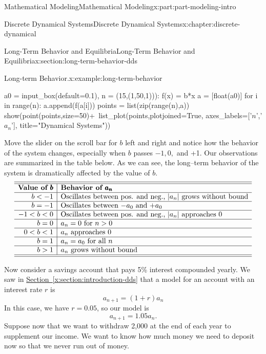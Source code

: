 \documentclass[oneside,10pt,]{book}
\newcommand{\xreffont}{\relax}
\numberwithin{equation}{section}
\newcommand{\lt}{<}
\newcommand{\gt}{>}
\newcommand{\amp}{&}
\begin{document}
\begin{partptx}{Mathematical Modeling}{}{Mathematical Modeling}{}{}{x:part:part-modeling-intro}
\begin{chapterptx}{Discrete Dynamical Systems}{}{Discrete Dynamical Systems}{}{}{x:chapter:discrete-dynamical}
\begin{sectionptx}{Long-Term Behavior and Equilibria}{}{Long-Term Behavior and Equilibria}{}{}{x:section:long-term-behavior-dds}
\begin{example}{Long-term Behavior.}{x:example:long-term-behavior}
\begin{sageinput}
				a0 = input_box(default=0.1), 
				n = (15,(1,50,1))):
    f(x) = b*x
    a = [float(a0)]
    for i in range(n):
        a.append(f(a[i]))
    points = list(zip(range(n),a))
    show(point(points,size=50)+\
         list_plot(points,plotjoined=True,
         axes_labels=['$n$','$a_n$'],
        title="Dynamical Systems"))
\end{sageinput}
Move the slider on the scroll bar for \(b\) left and right and notice how the behavior of the system changes, especially when \(b\) passes \(-1, 0,\) and +1. Our observations are summarized in the table below. As we can see, the long–term behavior of the system is dramatically affected by the value of \(b\).%
%
\begin{equation*}
\begin{array}{r|l}\hline\hline
\textbf{Value of $\pmb{b}$} \amp \textbf{Behavior of $\pmb{a_n}$} \\\hline
b \lt -1 \amp \textrm{Oscillates between pos. and neg., $|a_n|$ grows without bound} \\\hline
b = -1 \amp \textrm{Oscillates between $-a_0$ and $+a_0$} \\\hline
-1 \lt b \lt 0 \amp \textrm{Oscillates between pos. and neg., $|a_n|$ approaches 0} \\\hline
b = 0 \amp \textrm{$a_n = 0$ for $n > 0$} \\\hline
0\lt b \lt 1 \amp \textrm{$a_n$ approaches 0} \\\hline 
b = 1 \amp \textrm{$a_n = a_0$ for all $n$} \\\hline
b \gt 1 \amp \textrm{$a_n$ grows without bound} \\\hline\hline
\end{array}
\end{equation*}
\end{example}
Now consider a savings account that pays 5\% interest compounded yearly. We saw in \hyperref[x:section:introduction-dds]{Section~{\xreffont\ref{x:section:introduction-dds}}} that a model for an account with an interest rate \(r\) is%
%
\begin{equation*}
a_{n+1} = (1+r)a_n 
\end{equation*}
In this case, we have \(r = 0.05\), so our model is%
%
\begin{equation*}
a_{n+1} = 1.05a_n.
\end{equation*}
Suppose now that we want to withdraw \textdollar{}2,000 at the end of each year to supplement our income. We want to know how much money we need to deposit now so that we never run out of money.%

\end{sectionptx}
\end{chapterptx}
\end{partptx}
\end{document}

